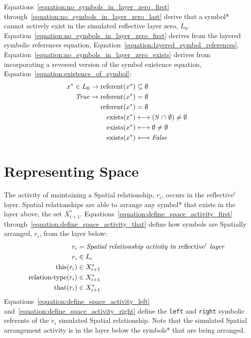 Equations~\ref{equation:no_symbols_in_layer_zero_first}
through~\ref{equation:no_symbols_in_layer_zero_last} derive that a
symbol* cannot actively exist in the simulated reflective layer zero,
$L_0$.  Equation~\ref{equation:no_symbols_in_layer_zero_first} derives
from the layered symbolic references equation,
Equation~\ref{equation:layered_symbol_references}.
Equation~\ref{equation:no_symbols_in_layer_zero_exists} derives from
incorporating a reversed version of the symbol existence equation,
Equation~\ref{equation:existence_of_symbol}:
\begin{align}
\label{equation:no_symbols_in_layer_zero_first}
       x^* \in L_0 \rightarrow \text{referent}(x^*) &\subseteq \emptyset \\
\text{\emph{True}} \rightarrow \text{referent}(x^*) &= \emptyset \\
                               \text{referent}(x^*) &= \emptyset \\
\label{equation:no_symbols_in_layer_zero_exists}
\text{exists}(x^*) &\longleftrightarrow (S ~{\cap}~ \emptyset) \neq \emptyset \\
\text{exists}(x^*) &\longleftrightarrow \emptyset \neq \emptyset \\
\text{exists}(x^*) &\longleftrightarrow \text{\emph{False}}
\label{equation:no_symbols_in_layer_zero_last}
\end{align}

\section{Representing Space}

The activity of maintaining a Spatial relationship, $r_i$, occurs in
the $\text{reflective}^i$ layer.  Spatial relationships are able to
arrange any symbol* that exists in the layer
above, the set $X_{i+1}^*$.
Equations~\ref{equation:define_space_activity_first}
through~\ref{equation:define_space_activity_that} define how symbols
are Spatially arranged, $r_i$, from the layer below:
\begin{align}
\label{equation:define_space_activity_first}
                      r_i &= \text{\emph{Spatial relationship activity in} reflective}^i\text{\emph{ layer}} \\
                      r_i &\in L_i \\
\label{equation:define_space_activity_this}
         \text{this}(r_i) &\in X_{i+1}^* \\
\label{equation:define_space_activity_relation_type}
\text{relation-type}(r_i) &\in X_{i+1}^* \\
\label{equation:define_space_activity_that}
         \text{that}(r_i) &\in X_{i+1}^*
\end{align}
Equations~\ref{equation:define_space_activity_left}
and~\ref{equation:define_space_activity_right} define the {\tt left}
and {\tt right} symbolic referents of the $r_i$ simulated Spatial
relationship.  Note that the simulated Spatial arrangement activity is
in the layer below the symbols* that are being arranged.

